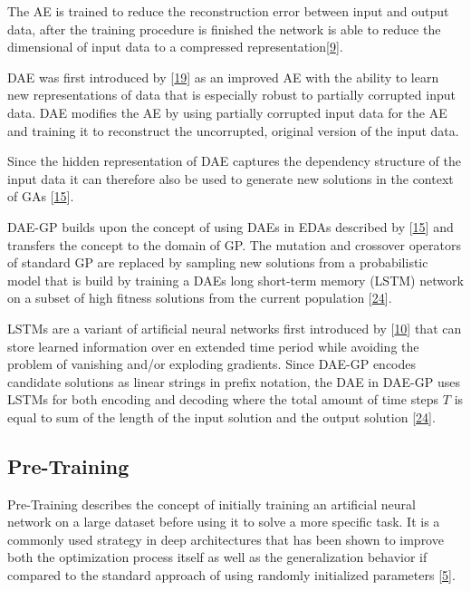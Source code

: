 \documentclass[
  11pt,
]{article}
\begin{document}
The AE is trained to reduce the reconstruction error between input and output data, after the training procedure is finished the network is able to reduce the dimensional of input data to a compressed representation{[}\protect\hyperlink{ref-ae_orig}{9}{]}.

DAE was first introduced by {[}\protect\hyperlink{ref-dae_orig2008}{19}{]} as an improved AE with the ability to learn new representations of data that is especially robust to partially corrupted input data. DAE modifies the AE by using partially corrupted input data for the AE and training it to reconstruct the uncorrupted, original version of the input data.

Since the hidden representation of DAE captures the dependency structure of the input data it can therefore also be used to generate new solutions in the context of GAs {[}\protect\hyperlink{ref-harmless_overfitting_eda}{15}{]}.

DAE-GP builds upon the concept of using DAEs in EDAs described by {[}\protect\hyperlink{ref-harmless_overfitting_eda}{15}{]} and transfers the concept to the domain of GP.
The mutation and crossover operators of standard GP are replaced by sampling new solutions from a probabilistic model that is build by training a DAEs long short-term memory (LSTM) network on a subset of high fitness solutions from the current population {[}\protect\hyperlink{ref-dae-gp_2020_rtree}{24}{]}.

LSTMs are a variant of artificial neural networks first introduced by {[}\protect\hyperlink{ref-lstm_orig}{10}{]} that can store learned information over en extended time period while avoiding the problem of vanishing and/or exploding gradients. Since DAE-GP encodes candidate solutions as linear strings in prefix notation, the DAE in DAE-GP uses LSTMs for both encoding and decoding where the total amount of time steps \(T\) is equal to sum of the length of the input solution and the output solution {[}\protect\hyperlink{ref-dae-gp_2020_rtree}{24}{]}.

\hypertarget{pre-training}{%
\subsection{Pre-Training}\label{pre-training}}

Pre-Training describes the concept of initially training an artificial neural network on a large dataset before using it to solve a more specific task.
It is a commonly used strategy in deep architectures that has been shown to improve both the optimization process itself as well as the generalization behavior if compared to the standard approach of using randomly initialized parameters {[}\protect\hyperlink{ref-pmlr-v5-erhan09a}{5}{]}.
\end{document}
